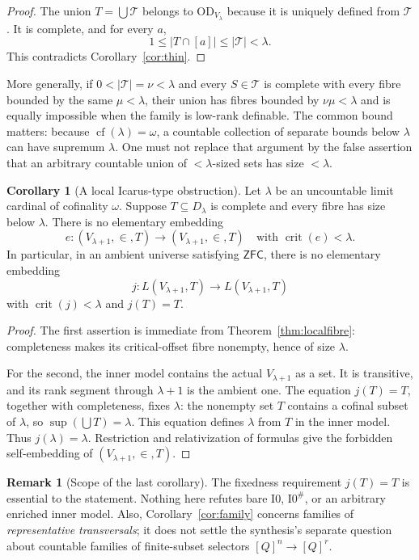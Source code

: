 \documentclass[11pt,letterpaper]{article}
\theoremstyle{definition}
\newtheorem{corollary}[definition]{Corollary}
\newtheorem{remark}[definition]{Remark}
\numberwithin{equation}{section}
\newcommand{\ZFC}{\mathsf{ZFC}}
\newcommand{\OD}{\mathrm{OD}}
\newcommand{\crit}{\operatorname{crit}}
\newcommand{\cf}{\operatorname{cf}}
\newcommand{\Izero}{\mathrm{I0}}
\begin{document}
\begin{proof}
The union $T=\bigcup\mathscr T$ belongs to $\OD_{V_\lambda}$ because it is uniquely defined from $\mathscr T$. It is complete, and for every $a$,
\[
 1\le |T\cap[a]|\le |\mathscr T|<\lambda.
\]
This contradicts Corollary~\ref{cor:thin}.
\end{proof}

More generally, if $0<|\mathscr T|=\nu<\lambda$ and every $S\in\mathscr T$ is complete with every fibre bounded by the same $\mu<\lambda$, their union has fibres bounded by $\nu\mu<\lambda$ and is equally impossible when the family is low-rank definable. The common bound matters: because $\cf(\lambda)=\omega$, a countable collection of separate bounds below $\lambda$ can have supremum $\lambda$. One must not replace that argument by the false assertion that an arbitrary countable union of $<\lambda$-sized sets has size $<\lambda$.

\begin{corollary}[A local Icarus-type obstruction]\label{cor:icarus}
Let $\lambda$ be an uncountable limit cardinal of cofinality $\omega$. Suppose $T\subseteq D_\lambda$ is complete and every fibre has size below $\lambda$. There is no elementary embedding
\[
 e:(V_{\lambda+1},\in,T)\longrightarrow(V_{\lambda+1},\in,T)
 \quad\text{with }\crit(e)<\lambda.
\]
In particular, in an ambient universe satisfying $\ZFC$, there is no elementary embedding
\[
 j:L(V_{\lambda+1},T)\longrightarrow L(V_{\lambda+1},T)
\]
with $\crit(j)<\lambda$ and $j(T)=T$.
\end{corollary}

\begin{proof}
The first assertion is immediate from Theorem~\ref{thm:localfibre}: completeness makes its critical-offset fibre nonempty, hence of size $\lambda$.

For the second, the inner model contains the actual $V_{\lambda+1}$ as a set. It is transitive, and its rank segment through $\lambda+1$ is the ambient one. The equation $j(T)=T$, together with completeness, fixes $\lambda$: the nonempty set $T$ contains a cofinal subset of $\lambda$, so $\sup(\bigcup T)=\lambda$. This equation defines $\lambda$ from $T$ in the inner model. Thus $j(\lambda)=\lambda$. Restriction and relativization of formulas give the forbidden self-embedding of $(V_{\lambda+1},\in,T)$.
\end{proof}

\begin{remark}[Scope of the last corollary]
The fixedness requirement $j(T)=T$ is essential to the statement. Nothing here refutes bare $\Izero$, $\Izero^\#$, or an arbitrary enriched inner model. Also, Corollary~\ref{cor:family} concerns families of \emph{representative transversals}; it does not settle the synthesis's separate question about countable families of finite-subset selectors $[Q]^n\to[Q]^r$.
\end{remark}
\end{document}
